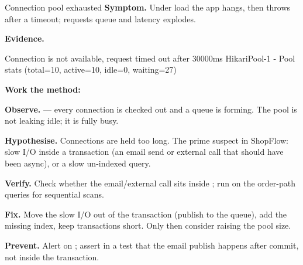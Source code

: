 \begin{debuglab}{Connection pool exhausted}
\textbf{Symptom.} Under load the app hangs, then throws  after a timeout; requests queue and latency explodes.

\smallskip\textbf{Evidence.}
\begin{propsbox}
Connection is not available, request timed out after 30000ms
HikariPool-1 - Pool stats (total=10, active=10, idle=0, waiting=27)
\end{propsbox}

\textbf{Work the method:}
\begin{tickcheck}
  \item \textbf{Observe.}  --- every connection is checked out and a queue is forming. The pool is not leaking idle; it is fully busy.
  \item \textbf{Hypothesise.} Connections are held too long. The prime suspect in ShopFlow: slow I/O inside a transaction (an email send or external call that should have been async), or a slow un-indexed query.
  \item \textbf{Verify.} Check whether the email/external call sits inside ; run  on the order-path queries for sequential scans.
  \item \textbf{Fix.} Move the slow I/O out of the transaction (publish to the queue), add the missing index, keep transactions short. Only then consider raising the pool size.
  \item \textbf{Prevent.} Alert on ; assert in a test that the email publish happens after commit, not inside the transaction.
\end{tickcheck}
\end{debuglab}

